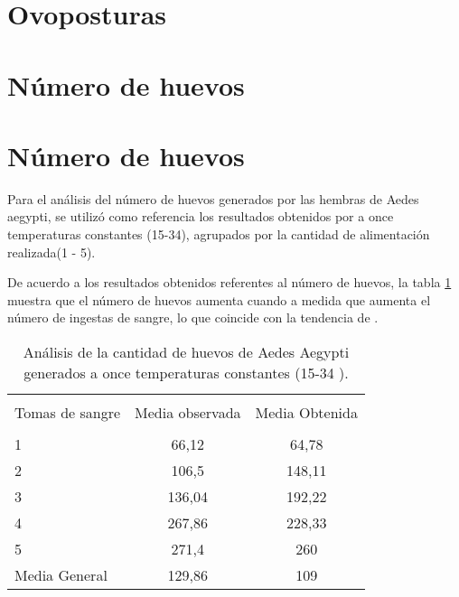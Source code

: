 \section{Ovoposturas}
\section{Número de huevos}
\section{Número de huevos}
Para el análisis del número de huevos generados por las hembras de Aedes
aegypti, se utilizó como referencia los resultados obtenidos por \cite{osoriopontificia} 
a once temperaturas constantes (15-34\textcelsius), agrupados por la cantidad de 
alimentación realizada(1 - 5).

De acuerdo a los resultados obtenidos referentes al número de huevos, la tabla
\ref{tab:ovipostura-cantidad-test} muestra que el número de huevos aumenta cuando 
a medida que aumenta el número de ingestas de sangre, lo que coincide con la 
tendencia de \cite{osoriopontificia}.

\begin{table}
    \begin{center}

        \caption{ \label{tab:ovipostura-cantidad-test} Análisis de la
        cantidad de huevos de Aedes Aegypti generados a once temperaturas
        constantes  (15-34 \textcelsius).}
        \begin{tabular}{p{3cm} c c  }
            \hline \\
            Tomas de sangre &Media observada & Media Obtenida \\
            \hline
            \hline \\
            1               & 66,12  & 64,78 \\
            2               & 106,5  & 148,11\\
            3               & 136,04 & 192,22\\
            4               & 267,86 & 228,33\\
            5               & 271,4  & 260   \\
            Media General   & 129,86 & 109   \\
        \end{tabular}
    \end{center}
\end{table}

